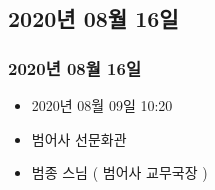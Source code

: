 \documentclass[aspectratio=1610,14pt,xcolor=pdftex,dvipsnames,table,handout]{beamer}
\begin{document}
		\begin{frame} [c]
		\section{2020년 08월 16일}						
		\frametitle{2020년 08월 16일}						

			\setlength{\leftmargini}{5em}			
			\begin{itemize}
				\item [일시]	2020년 08월 09일 10:20
				\item [징소]	범어사 선문화관
				\item [법문]	범종 스님 ( 범어사 교무국장 )
			\end{itemize}
							
		\end{frame}						


\end{document}
